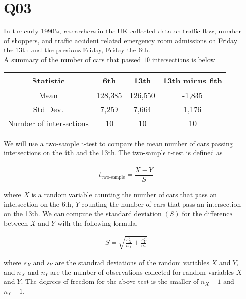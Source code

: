 \documentclass[11pt]{article}
\begin{document}
\clearpage

\section*{Q03}

In the early 1990's, researchers in the UK collected data on traffic flow, number of shoppers, and traffic accident related emergency room admissions on Friday the 13th and the previous Friday, Friday the 6th.\\

A summary of the number of cars that passed $10$ intersections is below

\begin{table}[ht!]
  \begin{tabular}{c|ccc}
    \hline
    Statistic & 6th & 13th & 13th minus 6th\\
    \hline
    Mean      & 128,385  & 126,550 & -1,835 \\
    Std Dev.  & 7,259    & 7,664   & 1,176 \\
    Number of intersections & 10 & 10 & 10 \\
    \hline
  \end{tabular}
\end{table}


We will use a two-sample t-test to compare the mean number of cars passing intersections on the 6th and the 13th.
The two-sample t-test is defined as

\begin{align}
  t_{\text{two-sample}} = \dfrac{\bar{ X } - \bar{ Y }}{ S }
\end{align}

where $X$ is a random variable counting the number of cars that pass an intersection on the 6th, $Y$ counting the number of cars that pass an intersection on the 13th.
We can compute the standard deviation $(S)$ for the difference between $X$ and $Y$ with the following formula.

\begin{align}
  S = \sqrt{ \frac{s_{X}^{2}}{n_{X}} + \frac{s_{Y}^{2}}{n_{Y}} }
\end{align}

where $s_{X}$ and $s_{Y}$ are the standrad deviations of the random variables $X$ and $Y$, and $n_{X}$ and $n_{Y}$ are the number of observations collected for random variables $X$ and $Y$.
The degrees of freedom for the above test is the smaller of $n_{X}-1$ and $n_{Y}-1$.\\
\end{document}
